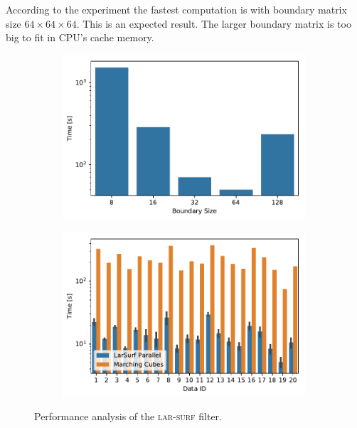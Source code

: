 According to the experiment the fastest computation is with boundary matrix size $64\times64\times64$. This is an expected result. The larger boundary matrix is too big to fit in CPU's cache memory.

\begin{figure}
\centering
\begin{subfigure}{0.495\textwidth}
\includegraphics[width=0.99\textwidth]{figs/bm_size_tesla.pdf} 
\label{fig:bm_size_tesla}
\end{subfigure}
\begin{subfigure}{0.495\textwidth}

\includegraphics[width=0.99\textwidth]{figs/ircad_comparison.pdf} 
\label{fig:ircad_comparison}
\end{subfigure}
\caption{Performance analysis of the \textsc{lar-surf} filter.}

\end{figure}



